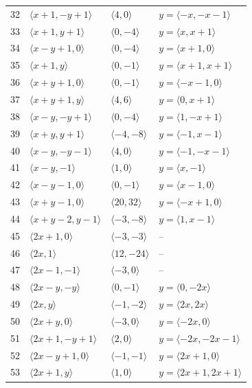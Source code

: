 \documentclass[11pt]{article}
\begin{document}
\begin{longtable}{@{}rlll@{}}
32 & $\langle x+1,-y+1\rangle$ & $\langle 4,0\rangle$ & $y=\langle -x,-x-1\rangle$\\
33 & $\langle x+1,y+1\rangle$ & $\langle 0,-4\rangle$ & $y=\langle x,x+1\rangle$\\
34 & $\langle x-y+1,0\rangle$ & $\langle 0,-4\rangle$ & $y=\langle x+1,0\rangle$\\
35 & $\langle x+1,y\rangle$ & $\langle 0,-1\rangle$ & $y=\langle x+1,x+1\rangle$\\
36 & $\langle x+y+1,0\rangle$ & $\langle 0,-1\rangle$ & $y=\langle -x-1,0\rangle$\\
37 & $\langle x+y+1,y\rangle$ & $\langle 4,6\rangle$ & $y=\langle 0,x+1\rangle$\\
38 & $\langle x-y,-y+1\rangle$ & $\langle 0,-4\rangle$ & $y=\langle 1,-x+1\rangle$\\
39 & $\langle x+y,y+1\rangle$ & $\langle -4,-8\rangle$ & $y=\langle -1,x-1\rangle$\\
40 & $\langle x-y,-y-1\rangle$ & $\langle 4,0\rangle$ & $y=\langle -1,-x-1\rangle$\\
41 & $\langle x-y,-1\rangle$ & $\langle 1,0\rangle$ & $y=\langle x,-1\rangle$\\
42 & $\langle x-y-1,0\rangle$ & $\langle 0,-1\rangle$ & $y=\langle x-1,0\rangle$\\
43 & $\langle x+y-1,0\rangle$ & $\langle 20,32\rangle$ & $y=\langle -x+1,0\rangle$\\
44 & $\langle x+y-2,y-1\rangle$ & $\langle -3,-8\rangle$ & $y=\langle 1,x-1\rangle$\\
45 & $\langle 2x+1,0\rangle$ & $\langle -3,-3\rangle$ & --\\
46 & $\langle 2x,1\rangle$ & $\langle 12,-24\rangle$ & --\\
47 & $\langle 2x-1,-1\rangle$ & $\langle -3,0\rangle$ & --\\
48 & $\langle 2x-y,-y\rangle$ & $\langle 0,-1\rangle$ & $y=\langle 0,-2x\rangle$\\
49 & $\langle 2x,y\rangle$ & $\langle -1,-2\rangle$ & $y=\langle 2x,2x\rangle$\\
50 & $\langle 2x+y,0\rangle$ & $\langle -3,0\rangle$ & $y=\langle -2x,0\rangle$\\
51 & $\langle 2x+1,-y+1\rangle$ & $\langle 2,0\rangle$ & $y=\langle -2x,-2x-1\rangle$\\
52 & $\langle 2x-y+1,0\rangle$ & $\langle -1,-1\rangle$ & $y=\langle 2x+1,0\rangle$\\
53 & $\langle 2x+1,y\rangle$ & $\langle 1,0\rangle$ & $y=\langle 2x+1,2x+1\rangle$\\

\end{longtable}
\end{document}
